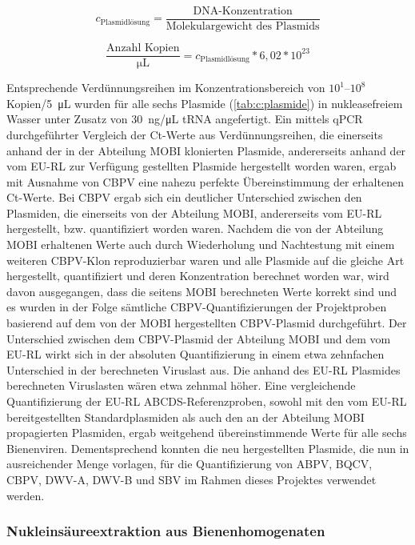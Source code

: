 \begin{equation}
    c_{\text{Plasmidlösung}} = \frac{\text{DNA-Konzentration}}{\text{Molekulargewicht des Plasmids}}
\end{equation}

\begin{equation}
    \frac{\text{Anzahl Kopien}}{\si{\micro\liter}} = c_{\text{Plasmidlösung}}*6,02*10^{23}
\end{equation}

Entsprechende Verdünnungsreihen im Konzentrationsbereich von $10^1$–$10^8$ Kopien/\SI{5}{\micro\liter} wurden für alle sechs Plasmide (\cref{tab:c:plasmide}) in nukleasefreiem Wasser unter Zusatz von \SI{30}{\nano\gram}/\si{\micro\liter} tRNA angefertigt. Ein mittels qPCR durchgeführter Vergleich der Ct-Werte aus Verdünnungsreihen, die einerseits anhand der in der Abteilung MOBI klonierten Plasmide, andererseits anhand der vom EU-RL zur Verfügung gestellten Plasmide hergestellt worden waren, ergab mit Ausnahme von CBPV eine nahezu perfekte Übereinstimmung der erhaltenen Ct-Werte. Bei CBPV ergab sich ein deutlicher Unterschied zwischen den Plasmiden, die einerseits von der Abteilung MOBI, andererseits vom EU-RL hergestellt, bzw. quantifiziert worden waren. Nachdem die von der Abteilung MOBI erhaltenen Werte auch durch Wiederholung und Nachtestung mit einem weiteren CBPV-Klon reproduzierbar waren und alle Plasmide auf die gleiche Art hergestellt, quantifiziert und deren Konzentration berechnet worden war, wird davon ausgegangen, dass die seitens MOBI berechneten Werte korrekt sind und es wurden in der Folge sämtliche CBPV-Quantifizierungen der Projektproben basierend auf dem von der MOBI hergestellten CBPV-Plasmid durchgeführt. Der Unterschied zwischen dem CBPV-Plasmid der Abteilung MOBI und dem vom EU-RL wirkt sich in der absoluten Quantifizierung in einem etwa zehnfachen Unterschied in der berechneten Viruslast aus. Die anhand des EU-RL Plasmides berechneten Viruslasten wären etwa zehnmal höher. Eine vergleichende Quantifizierung der EU-RL ABCDS-Referenzproben, sowohl mit den vom EU-RL bereitgestellten Standardplasmiden als auch den an der Abteilung MOBI propagierten Plasmiden, ergab weitgehend übereinstimmende Werte für alle sechs Bienenviren. Dementsprechend konnten die neu hergestellten Plasmide, die nun in ausreichender Menge vorlagen, für die Quantifizierung von ABPV, BQCV, CBPV, DWV-A, DWV-B und SBV im Rahmen dieses Projektes verwendet werden.

\subsubsection{Nukleinsäureextraktion aus Bienenhomogenaten} 
\label{chap:extraktion}

